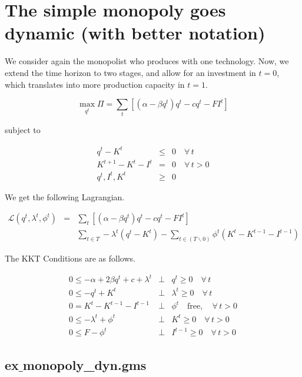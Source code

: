 \documentclass[11pt,a4paper]{article}
\begin{document}



\section{The simple monopoly goes dynamic (with better notation)}


We consider again the monopolist who produces with one technology. Now, we extend the time horizon to two stages, and allow for an investment in $t=0$, which translates into more production capacity in $t=1$.

\begin{equation*}
	\max_{q^t}\Pi = \sum_t\left[(\alpha-\beta q^t)q^t - cq^t  -FI^t\right]
\end{equation*}

subject to

\begin{eqnarray*}
	q^t - K^t &\leq& 0\quad \forall \,t\\
        K^{t+1} - K^t - I^t &=& 0 \quad \forall \, t>0\\
	q^t,I^t,K^t &\geq& 0 
\end{eqnarray*}
 
We get the following Lagrangian.

\begin{eqnarray*}
	\mathcal{L}(q^t,\lambda^t,\phi^t)&=& \sum_t\left[(\alpha-\beta q^t)q^t - cq^t  -FI^t\right] \\
        && \sum_{t\in T}- \lambda^t(q^t-K^t) - \sum_{t\in (T\backslash 0)}\phi^t(K^{t}-K^{t-1}-I^{t-1})
\end{eqnarray*}

The KKT Conditions are as follows.
 
\begin{eqnarray*}
	0 \leq -\alpha + 2\beta q^t + c + \lambda^t &\bot& q^t \geq 0 \quad\forall\,t\\
	0 \leq -q^t + K^t &\bot& \lambda^t \geq 0 \quad\forall\,t\\
        0 = K^{t} - K^{t-1} - I^{t-1} &\bot& \phi^t \quad \mbox{free}, \quad\forall\,t>0 \\
        0 \leq -\lambda^t + \phi^t &\bot& K^t \geq 0  \quad\forall\,t>0 \\
        0 \leq F - \phi^t &\bot& I^{t-1} \geq 0  \quad\forall\,t>0
\end{eqnarray*}


\subsection*{ex$\_$monopoly\_dyn.gms}
\end{document}

